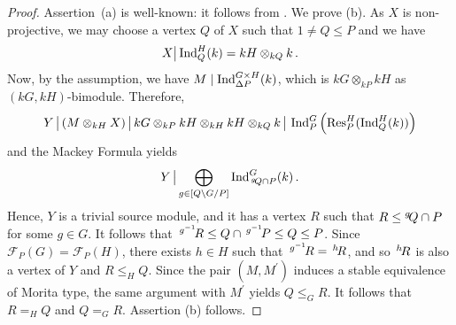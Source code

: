 \begin{proof}
    Assertion~(a) is well-known: it  follows from \cite[Proposition 4.13.2]{LinckelmannVol1}. 
    We prove (b). As $X$ is non-projective, we may choose a vertex $Q$ of $X$ such that $1\neq Q\leq P$ and we have 
    \[    
    X \big| \operatorname{Ind}_Q^H(k)=kH\otimes_{kQ}k\,.
    \]
    Now, by the assumption, we have $M\mid \operatorname{Ind}_{\Delta P}^{G\times H}(k)$, which is $kG\otimes_{kP}kH$ as  $(kG,kH)$-bimodule.
    Therefore, 
    \[
    Y\,\big| \left(M\otimes_{kH}X\right) \big|\,  kG\otimes_{kP}kH \otimes_{kH}kH\otimes_{kQ}k \,\big|\, \operatorname{Ind}_P^G\left(   
                \operatorname{Res}^H_P(\operatorname{Ind}_{Q}^{H}(k))
            \right)
   \]
   and the Mackey Formula yields 
   \[
    Y \,\big|   \bigoplus_{g\in [Q\backslash G/P]}\operatorname{Ind}_{\,^{g}\!Q\cap P}^{G}(k)\,.
   \]
   Hence, $Y$ is a trivial source module, and it has a vertex $R$ such that  $R\leq\!\,^{g}\!Q\cap P$ for some $g\in G$.  It follows that $\,^{g^{-1}}\!R\leq Q\cap \,^{g^{-1}}\!P\leq Q\leq P$. Since $\mathcal{F}_P(G)=\mathcal{F}_P(H)$, there exists $h\in H$ such that   $\,^{g^{-1}}\!R=\,^{h}\!R$, and so $\,^{h}\!R$ is also a vertex of $Y$ and $R\leq_H Q$. Since the pair $(M, M^{\prime})$ induces a stable equivalence of Morita type, the same argument with $M^{\prime}$ yields $Q\leq_G R$. It follows that $R=_{H}Q$ and $Q=_GR$. Assertion (b) follows. 
\end{proof}
